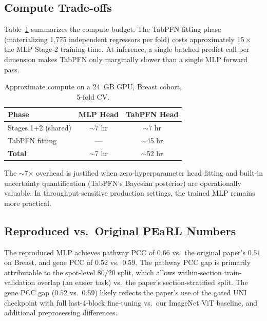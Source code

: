 \documentclass[conference]{IEEEtran}
\begin{document}
\subsection{Compute Trade-offs}

Table~\ref{tab:compute} summarizes the compute budget.
The TabPFN fitting phase (materializing 1{,}775 independent regressors per fold)
costs approximately $15\times$ the MLP Stage-2 training time.
At inference, a single batched predict call per dimension makes TabPFN only
marginally slower than a single MLP forward pass.

\begin{table}[h]
\centering
\caption{Approximate compute on a 24~GB GPU, Breast cohort, 5-fold CV.}
\label{tab:compute}
\begin{tabular}{lcc}
\toprule
\textbf{Phase} & \textbf{MLP Head} & \textbf{TabPFN Head} \\
\midrule
Stages 1+2 (shared)        & $\sim$7 hr   & $\sim$7 hr \\
TabPFN fitting              & ---           & $\sim$45 hr \\
\midrule
\textbf{Total}              & $\sim$7 hr   & $\sim$52 hr \\
\bottomrule
\end{tabular}
\end{table}

The $\sim$7$\times$ overhead is justified when zero-hyperparameter head fitting
and built-in uncertainty quantification (TabPFN's Bayesian posterior) are
operationally valuable.
In throughput-sensitive production settings, the trained MLP remains more
practical.

\subsection{Reproduced vs.\ Original PEaRL Numbers}

The reproduced MLP achieves pathway PCC of $0.66$ vs.\ the original paper's
$0.51$ on Breast, and gene PCC of $0.52$ vs.\ $0.59$.
The pathway PCC gap is primarily attributable to the spot-level 80/20 split,
which allows within-section train-validation overlap (an easier task) vs.\ the
paper's section-stratified split.
The gene PCC gap ($0.52$ vs.\ $0.59$) likely reflects the paper's use of the
gated UNI checkpoint with full last-4-block fine-tuning vs.\ our ImageNet ViT
baseline, and additional preprocessing differences.

\end{document}
